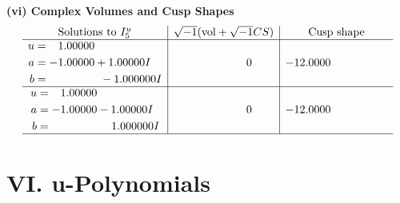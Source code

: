 \documentclass[1p]{elsarticle_modified}
\theoremstyle{definition}
\newcommand{\I}{\sqrt{-1}}
\begin{document}
\newpage\flushleft \textbf{(vi) Complex Volumes and Cusp Shapes}
$$\begin{array}{c|c|c}  
\text{Solutions to }I^u_{5}& \I (\text{vol} + \sqrt{-1}CS) & \text{Cusp shape}\\
 \hline 
\begin{aligned}
u &= \phantom{-}1.00000\phantom{ +0.000000I} \\
a &= -1.00000 + 1.00000 I \\
b &= \phantom{-0.000000 } -1.000000 I\end{aligned}
 & \phantom{-0.000000 } 0 & -12.0000\phantom{ +0.000000I} \\ \hline\begin{aligned}
u &= \phantom{-}1.00000\phantom{ +0.000000I} \\
a &= -1.00000 - 1.00000 I \\
b &= \phantom{-0.000000 -}1.000000 I\end{aligned}
 & \phantom{-0.000000 } 0 & -12.0000\phantom{ +0.000000I}\\
 \hline 
 \end{array}$$\newpage
\newpage\renewcommand{\arraystretch}{1}
\centering \section*{ VI. u-Polynomials}
\end{document}
